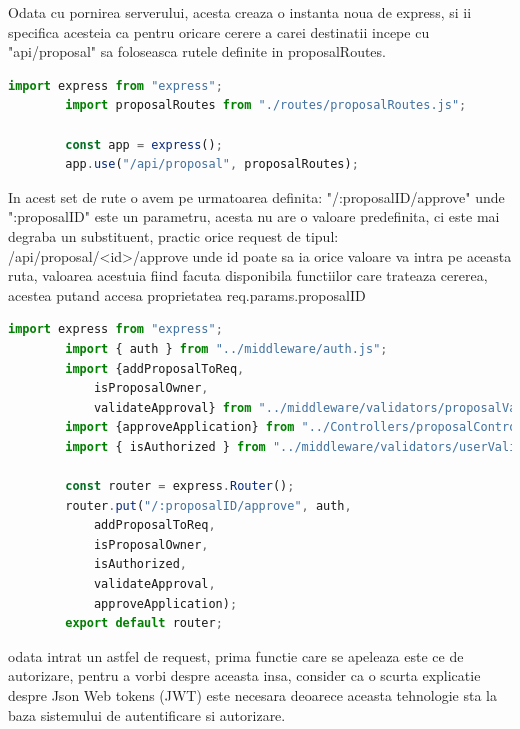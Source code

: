 \documentclass[12pt,a4paper,hidelinks]{report}
\theoremstyle{definition}
\theoremstyle{remark}
\begin{document}
    Odata cu pornirea serverului, acesta creaza o instanta noua de express, si ii specifica acesteia ca pentru oricare cerere a carei 
    destinatii incepe cu "api/proposal" sa foloseasca rutele definite in proposalRoutes.
    \begin{lstlisting}[language=Javascript]
        import express from "express";
        import proposalRoutes from "./routes/proposalRoutes.js";

        const app = express();
        app.use("/api/proposal", proposalRoutes);
    \end{lstlisting}
    In acest set de rute o avem pe urmatoarea definita: "/:proposalID/approve" unde ":proposalID" este un parametru, acesta nu are o valoare predefinita,
    ci este mai degraba un substituent, practic orice request de tipul: /api/proposal/<id>/approve  
    unde id poate sa ia orice valoare va intra pe aceasta ruta, valoarea acestuia fiind facuta disponibila functiilor care
    trateaza cererea, acestea putand accesa proprietatea req.params.proposalID
    \begin{lstlisting}[language=Javascript]
        import express from "express";
        import { auth } from "../middleware/auth.js";
        import {addProposalToReq,
            isProposalOwner,
            validateApproval} from "../middleware/validators/proposalValidator.js";
        import {approveApplication} from "../Controllers/proposalController.js";
        import { isAuthorized } from "../middleware/validators/userValidator.js";

        const router = express.Router();
        router.put("/:proposalID/approve", auth,
            addProposalToReq,
            isProposalOwner,
            isAuthorized,
            validateApproval,
            approveApplication);
        export default router;
    \end{lstlisting}
    odata intrat un astfel de request, prima functie care se apeleaza este ce de autorizare,
    pentru a vorbi despre aceasta insa, consider ca o scurta explicatie despre Json Web tokens (JWT)
    este necesara deoarece aceasta tehnologie sta la baza sistemului de autentificare si autorizare.
    
\end{document}
